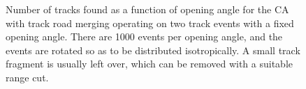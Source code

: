 \begin{figure}
\centering
\caption[Track count as a function of angle for CA with merging operating on toy MC events]{\label{fig:ca_toy_merged_trackcounts}Number of tracks found as a function of opening angle for the \ac{CA} with track road merging operating on two track events with a fixed opening angle. There are 1000 events per opening angle, and the events are rotated so as to be distributed isotropically. A small track fragment is usually left over, which can be removed with a suitable range cut.}
\end{figure}


